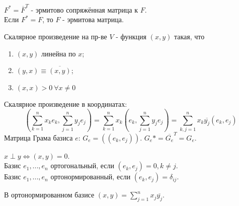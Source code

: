 \begin{definition}
    $F^* = \overline{F}^T$ - эрмитово сопряжённая матрица к $F$.\\
    Если $F^* = F$, то $F$ - эрмитова матрица.
\end{definition} 
\begin{definition}
    Скалярное произведение на пр-ве $V$ - функция $(x,y)$ такая, что
    \begin{enumerate}
        \item $(x,y)$ линейна по $x$;
        \item $(y,x) \equiv \overline{(x,y)}$;
        \item $(x,x) > 0 \ \forall x \neq 0$
    \end{enumerate}
\end{definition}
Скалярное произведение в координатах:
$$(\sum \limits_{k=1}^n x_ke_k, \sum \limits_{j=1}^n y_je_j) = \sum \limits_{k=1}^n x_k(e_k, \sum \limits_{j=1}^n y_je_j) = \sum \limits_{k, j=1}^n x_k\overline{y_j}(e_k, e_j)$$
Матрица Грама базиса $e$: $G_e = ((e_k, e_j))$. $G_e* = \overline{G_e}^T = G_e$.
\begin{definition}
    $x \perp y \Longleftrightarrow (x, y) = 0$.\\
    Базис $e_1,...,e_n$ ортогональный, если $(e_k, e_j) = 0, k \neq j$.\\
    Базис $e_1,...,e_n$ ортонормированный, если $(e_k, e_j) = \delta_{ij}$.
\end{definition}
В ортонормированном базисе $(x, y) = \sum \limits_{j=1}^n x_j\overline{y_j}$.